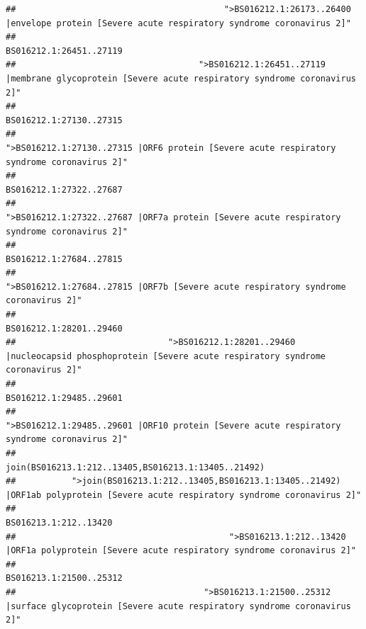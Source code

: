 \documentclass[
]{article}
\begin{document}
\begin{verbatim}
##                                         ">BS016212.1:26173..26400 |envelope protein [Severe acute respiratory syndrome coronavirus 2]" 
##                                                                                                                BS016212.1:26451..27119 
##                                    ">BS016212.1:26451..27119 |membrane glycoprotein [Severe acute respiratory syndrome coronavirus 2]" 
##                                                                                                                BS016212.1:27130..27315 
##                                             ">BS016212.1:27130..27315 |ORF6 protein [Severe acute respiratory syndrome coronavirus 2]" 
##                                                                                                                BS016212.1:27322..27687 
##                                            ">BS016212.1:27322..27687 |ORF7a protein [Severe acute respiratory syndrome coronavirus 2]" 
##                                                                                                                BS016212.1:27684..27815 
##                                                    ">BS016212.1:27684..27815 |ORF7b [Severe acute respiratory syndrome coronavirus 2]" 
##                                                                                                                BS016212.1:28201..29460 
##                              ">BS016212.1:28201..29460 |nucleocapsid phosphoprotein [Severe acute respiratory syndrome coronavirus 2]" 
##                                                                                                                BS016212.1:29485..29601 
##                                            ">BS016212.1:29485..29601 |ORF10 protein [Severe acute respiratory syndrome coronavirus 2]" 
##                                                                                    join(BS016213.1:212..13405,BS016213.1:13405..21492) 
##           ">join(BS016213.1:212..13405,BS016213.1:13405..21492) |ORF1ab polyprotein [Severe acute respiratory syndrome coronavirus 2]" 
##                                                                                                                  BS016213.1:212..13420 
##                                          ">BS016213.1:212..13420 |ORF1a polyprotein [Severe acute respiratory syndrome coronavirus 2]" 
##                                                                                                                BS016213.1:21500..25312 
##                                     ">BS016213.1:21500..25312 |surface glycoprotein [Severe acute respiratory syndrome coronavirus 2]" 

\end{verbatim}
\end{document}
